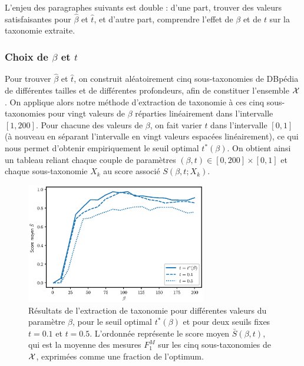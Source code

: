 L'enjeu des paragraphes suivants est double : d'une part, trouver des valeurs satisfaisantes pour $\hat{\beta}$ et $\hat{t}$, et d'autre part, comprendre l'effet de $\beta$ et de $t$ sur la taxonomie extraite.

\subsubsection{Choix de \texorpdfstring{$\beta$}{beta} et \texorpdfstring{$t$}{t}}
\label{subsec:te-hp-values}

Pour trouver $\hat{\beta}$ et $\hat{t}$, on construit aléatoirement cinq sous-taxonomies de DBpédia de différentes tailles et de différentes profondeurs, afin de constituer l'ensemble $\cal{X}$.
On applique alors notre méthode d'extraction de taxonomie à ces cinq sous-taxonomies pour vingt valeurs de $\beta$ réparties linéairement dans l'intervalle $[1, 200]$. Pour chacune des valeurs de $\beta$, on fait varier $t$ dans l'intervalle $[0, 1]$ (à nouveau en séparant l'intervalle en vingt valeurs espacées linéairement), ce qui nous permet d'obtenir empiriquement le seuil optimal $t^*(\beta)$. On obtient ainsi un tableau reliant chaque couple de paramètres $(\beta, t) \in [0, 200] \times [0, 1]$  et chaque sous-taxonomie $X_k$ au score associé $S(\beta, t; X_k)$.


\begin{figure}[h]
    \centering
    \includegraphics[width=0.7\textwidth]{fig/plot/average_beta_vs_best_all_FR.eps}
    \caption[Influence du paramètre $\beta$]{Résultats de l'extraction de taxonomie pour différentes valeurs du paramètre $\beta$, pour le seuil optimal $t^*(\beta)$ et pour deux seuils fixes $t=0.1$ et $t=0.5$. 
    L'ordonnée représente le score moyen $\bar{S}(\beta, t)$, qui est la moyenne des mesures $F_1^M$ sur les cinq sous-taxonomies de $\cal{X}$, exprimées comme une fraction de l'optimum.
    }
    \label{fig:beta-search-1}
\end{figure}


